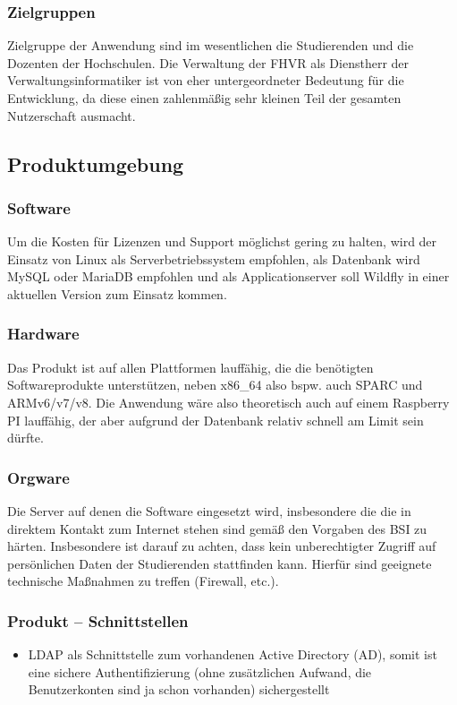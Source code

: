 \documentclass[12pt,a4paper,parskip]{scrreprt}
\begin{document}
\subsubsection{Zielgruppen}
Zielgruppe der Anwendung sind im wesentlichen die Studierenden und die Dozenten der Hochschulen. Die Verwaltung der FHVR als Dienstherr der Verwaltungsinformatiker ist von eher untergeordneter Bedeutung für die Entwicklung, da diese einen zahlenmäßig sehr kleinen Teil der gesamten Nutzerschaft ausmacht.
\subsection{Produktumgebung}
\subsubsection{Software}
Um die Kosten für Lizenzen und Support möglichst gering zu halten, wird der Einsatz von Linux als Serverbetriebssystem empfohlen, als Datenbank wird MySQL oder MariaDB empfohlen und als Applicationserver soll Wildfly in einer aktuellen Version zum Einsatz kommen.
\subsubsection{Hardware}
Das Produkt ist auf allen Plattformen lauffähig, die die benötigten Softwareprodukte unterstützen, neben x86\_64 also bspw. auch SPARC und ARMv6/v7/v8. Die Anwendung wäre also theoretisch auch auf einem Raspberry PI lauffähig, der aber aufgrund der Datenbank relativ schnell am Limit sein dürfte.
\subsubsection{Orgware}
Die Server auf denen die Software eingesetzt wird, insbesondere die die in direktem Kontakt zum Internet stehen sind gemäß den Vorgaben des BSI zu härten. Insbesondere ist darauf zu achten, dass kein unberechtigter Zugriff auf persönlichen Daten der Studierenden stattfinden kann. Hierfür sind geeignete technische Maßnahmen zu treffen (Firewall, etc.).
\subsubsection{Produkt – Schnittstellen}
\begin{itemize}
\item LDAP als Schnittstelle zum vorhandenen Active Directory (AD), somit ist eine sichere Authentifizierung (ohne zusätzlichen Aufwand, die Benutzerkonten sind ja schon vorhanden) sichergestellt
\end{itemize}
\end{document}
